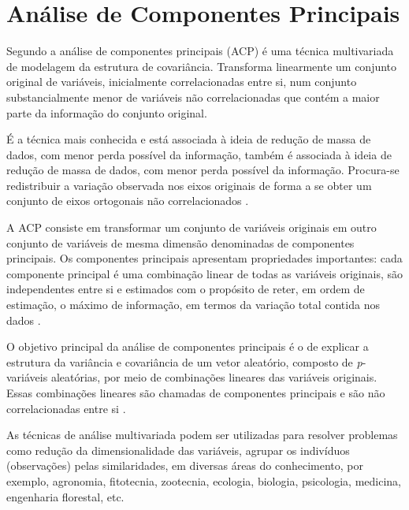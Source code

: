 


\section{Análise de Componentes Principais}

Segundo \cite{sandanielo2015} a análise de componentes principais (ACP) é uma técnica multivariada de modelagem da estrutura de covariância. 
Transforma linearmente um conjunto
original de variáveis, inicialmente correlacionadas  entre si, num conjunto substancialmente menor de variáveis não correlacionadas que contém a maior parte da informação do conjunto original. 

É a técnica mais conhecida e
está associada à ideia de redução de massa de dados, com menor perda possível da
informação,
também é associada à ideia de redução de
massa de dados, com menor perda possível
da informação. Procura-se redistribuir a
variação observada nos eixos originais de
forma a se obter um conjunto de eixos
ortogonais não correlacionados  .


A ACP consiste em transformar
um conjunto de variáveis originais em outro
conjunto de variáveis de mesma dimensão
denominadas de componentes principais.
Os componentes principais apresentam
propriedades importantes: cada
componente principal é uma combinação linear de todas as variáveis originais, são
independentes entre si e estimados com o
propósito de reter, em ordem de estimação,
o máximo de informação, em termos da
variação total contida nos dados
   .

O objetivo principal da análise de
componentes principais é o de explicar a
estrutura da variância e covariância de um
vetor aleatório, composto de \textit{p}-variáveis
aleatórias, por meio de combinações
lineares das variáveis originais. Essas
combinações lineares são chamadas de
componentes principais e são não
correlacionadas entre si \cite{sandanielo2015}.

As técnicas de análise multivariada podem ser
utilizadas para resolver problemas como redução da dimensionalidade das variáveis, agrupar os
indivíduos (observações) pelas
similaridades, em diversas áreas do
conhecimento, por exemplo, agronomia,
fitotecnia, zootecnia, ecologia, biologia,
psicologia, medicina, engenharia florestal,
etc.

